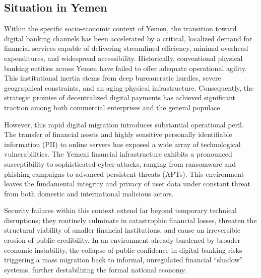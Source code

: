 \documentclass[12pt,a4paper,oneside]{report}
\begin{document}
	\subsection{Situation in Yemen}
	Within the specific socio-economic context of Yemen, the transition toward digital banking channels has been accelerated by a critical, localized demand for financial services capable of delivering streamlined efficiency, minimal overhead expenditures, and widespread accessibility. Historically, conventional physical banking entities across Yemen have failed to offer adequate operational agility. This institutional inertia stems from deep bureaucratic hurdles, severe geographical constraints, and an aging physical infrastructure. Consequently, the strategic promise of decentralized digital payments has achieved significant traction among both commercial enterprises and the general populace.
	
	However, this rapid digital migration introduces substantial operational peril. The transfer of financial assets and highly sensitive personally identifiable information (PII) to online servers has exposed a wide array of technological vulnerabilities. The Yemeni financial infrastructure exhibits a pronounced susceptibility to sophisticated cyber-attacks, ranging from ransomware and phishing campaigns to advanced persistent threats (APTs). This environment leaves the fundamental integrity and privacy of user data under constant threat from both domestic and international malicious actors. 
	
	Security failures within this context extend far beyond temporary technical disruptions; they routinely culminate in catastrophic financial losses, threaten the structural viability of smaller financial institutions, and cause an irreversible erosion of public credibility. In an environment already burdened by broader economic instability, the collapse of public confidence in digital banking risks triggering a mass migration back to informal, unregulated financial ``shadow'' systems, further destabilizing the formal national economy.
	
	
\end{document}
